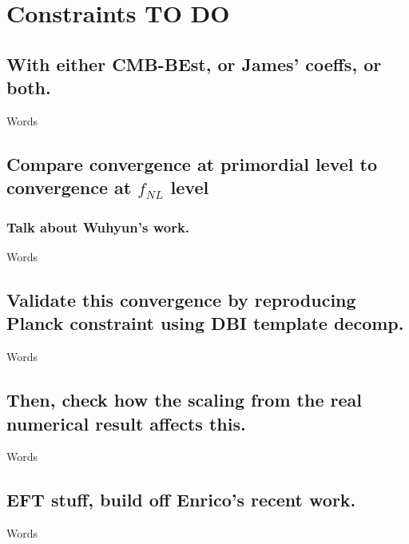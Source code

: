 %
\chapter{Constraints TO DO}\label{chapter:constraints}
\section{With either CMB-BEst, or James' coeffs, or both.}
    Words
\section{Compare convergence at primordial level to convergence at $f_{NL}$ level}
    \subsection{Talk about Wuhyun's work.}
    Words
\section{Validate this convergence by reproducing Planck constraint using DBI template decomp.}
    Words
\section{Then, check how the scaling from the real numerical result affects this.}
    Words
\section{EFT stuff, build off Enrico's recent work.}
    Words
